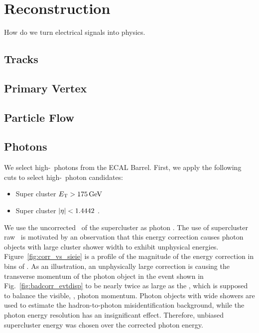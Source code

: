 \chapter{Reconstruction}

How do we turn electrical signals into physics.

\section{Tracks}
\label{sec:tracks}

\section{Primary Vertex}
\label{sec:vertex}

\section{Particle Flow}
\label{sec:particle_flow}

\section{Photons}
\label{sec:photons}

We select high-\ET\ photons from the ECAL Barrel. First, we apply the following cuts to select high-\ET\ photon candidates:
\begin{itemize}
\item Super cluster $E_{\mathrm{T}} > 175\,\text{Ge\hspace{-.08em}V}$
\item Super cluster $\lvert \eta \rvert < 1.4442$ .
\end{itemize}
We use the uncorrected \ET\ of the supercluster as photon \ET. 
The use of supercluster raw \ET\ is motivated by an observation that this energy correction causes photon objects with large cluster shower width to exhibit unphysical energies. 
Figure~\ref{fig:corr_vs_sieie} is a profile of the magnitude of the energy correction in bins of \sieie. 
As an illustration, an unphysically large correction is causing the transverse momentum of the photon object in the event shown in Fig.~\ref{fig:badcorr_evtdisp} to be nearly twice as large as the \met, which is supposed to balance the visible, \ie, photon momentum. 
Photon objects with wide showers are used to estimate the hadron-to-photon misidentification background, while the photon energy resolution has an insignificant effect. 
Therefore, unbiased supercluster energy was chosen over the corrected photon energy.

